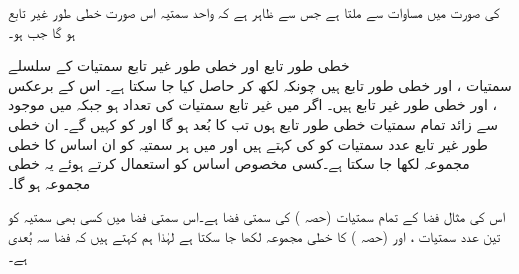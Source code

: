  کی صورت میں مساوات  سے  ملتا ہے جس سے ظاہر ہے کہ واحد سمتیہ  اس صورت خطی طور غیر تابع ہو گا جب  ہو۔

\quad خطی طور تابع اور خطی طور غیر تابع سمتیات کے سلسلے\\
سمتیات ،  اور  خطی طور تابع ہیں چونکہ
  لکھ کر  حاصل کیا جا سکتا ہے۔ اس کے برعکس ،  اور  خطی طور غیر تابع ہیں۔
اگر  میں غیر تابع سمتیات کی تعداد  ہو  جبکہ  میں موجود   سے زائد  تمام سمتیات خطی طور تابع ہوں تب  کا بُعد  ہو گا اور  کو   کہیں گے۔ ان خطی طور غیر تابع  عدد سمتیات کو  کی  کہتے ہیں اور  میں ہر سمتیہ کو ان اساس کا خطی مجموعہ لکھا جا سکتا ہے۔کسی مخصوص اساس کو استعمال کرتے ہوئے یہ خطی مجموعہ  ہو گا۔

اس کی مثال فضا کے تمام سمتیات (حصہ ) کی سمتی فضا ہے۔اس سمتی فضا میں کسی بھی سمتیہ کو تین عدد سمتیات  ،  اور   (حصہ ) کا خطی مجموعہ لکھا جا سکتا ہے لہٰذا ہم کہتے ہیں کہ فضا سہ بُعدی  ہے۔

